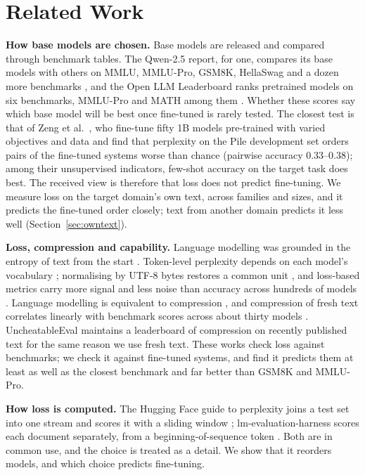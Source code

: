 \documentclass[10pt]{article}
\begin{document}
\section{Related Work}
\label{sec:related}
\textbf{How base models are chosen.} Base models are released and compared through benchmark
tables. The Qwen-2.5 report, for one, compares its base models with others on MMLU, MMLU-Pro, GSM8K,
HellaSwag and a dozen more benchmarks \citep{yang2024qwen25}, and the Open LLM Leaderboard ranks
pretrained models on six benchmarks, MMLU-Pro and MATH among them \citep{fourrier2024leaderboard}.
Whether these scores say which base model will be best once fine-tuned is rarely tested. The closest
test is that of Zeng et al.\ \citep{zeng2025indicators}, who fine-tune fifty 1B models pre-trained with varied objectives and data
and find that perplexity on the Pile development set orders pairs of the fine-tuned systems worse
than chance (pairwise accuracy $0.33$--$0.38$); among their unsupervised indicators, few-shot
accuracy on the target task does best. The
received view is therefore that loss does not predict fine-tuning. We measure loss on the target
domain's own text, across families and sizes, and it predicts the fine-tuned order closely; text
from another domain predicts it less well (Section~\ref{sec:owntext}).

\textbf{Loss, compression and capability.} Language modelling was grounded in the entropy of text
from the start \citep{shannon1951prediction}. Token-level perplexity depends on each model's
vocabulary \citep{mielke2019perplexity,ahia2023languages}; normalising by UTF-8 bytes restores a
common unit \citep{gao2021pile,magnusson2023paloma}, and loss-based metrics carry more signal and
less noise than accuracy across hundreds of models \citep{heineman2025signal}. Language modelling
is equivalent to compression \citep{deletang2024compression}, and compression of fresh text
correlates linearly with benchmark scores across about thirty models
\citep{huang2024compression}. UncheatableEval \citep{uncheatableeval} maintains a leaderboard of
compression on recently published text for the same reason we use fresh text. These works check
loss against benchmarks; we check it against fine-tuned systems, and find it predicts them at least
as well as the closest benchmark and far better than GSM8K and MMLU-Pro.

\textbf{How loss is computed.} The Hugging Face guide to perplexity joins a test set into one stream
and scores it with a sliding window \citep{hfperplexity}; lm-evaluation-harness scores each document
separately, from a beginning-of-sequence token \citep{gao2024lmeval}. Both are in common use, and
the choice is treated as a detail. We show that it reorders models, and which choice predicts fine-tuning.
\end{document}
